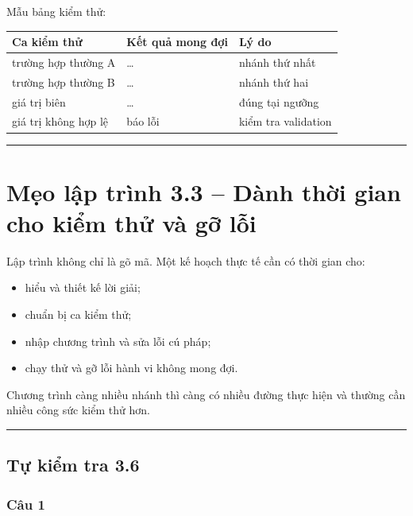 \documentclass[
  11pt,
  a4paper,
]{article}
\providecommand{\tightlist}{%
  \setlength{\itemsep}{0pt}\setlength{\parskip}{0pt}}
\begin{document}
Mẫu bảng kiểm thử:

\begin{longtable}[]{@{}lll@{}}
\toprule\noalign{}
Ca kiểm thử & Kết quả mong đợi & Lý do \\
\midrule\noalign{}
\endhead
\bottomrule\noalign{}
\endlastfoot
trường hợp thường A & \ldots{} & nhánh thứ nhất \\
trường hợp thường B & \ldots{} & nhánh thứ hai \\
giá trị biên & \ldots{} & đúng tại ngưỡng \\
giá trị không hợp lệ & báo lỗi & kiểm tra validation \\
\end{longtable}

\begin{center}\rule{0.5\linewidth}{0.5pt}\end{center}

\section{Mẹo lập trình 3.3 -- Dành thời gian cho kiểm thử và gỡ
lỗi}\label{mux1eb9o-lux1eadp-truxecnh-3.3-duxe0nh-thux1eddi-gian-cho-kiux1ec3m-thux1eed-vuxe0-gux1ee1-lux1ed7i}

Lập trình không chỉ là gõ mã. Một kế hoạch thực tế cần có thời gian cho:

\begin{itemize}
\tightlist
\item
  hiểu và thiết kế lời giải;
\item
  chuẩn bị ca kiểm thử;
\item
  nhập chương trình và sửa lỗi cú pháp;
\item
  chạy thử và gỡ lỗi hành vi không mong đợi.
\end{itemize}

Chương trình càng nhiều nhánh thì càng có nhiều đường thực hiện và
thường cần nhiều công sức kiểm thử hơn.

\begin{center}\rule{0.5\linewidth}{0.5pt}\end{center}

\subsection{Tự kiểm tra 3.6}\label{tux1ef1-kiux1ec3m-tra-3.6}

\subsubsection{Câu 1}\label{cuxe2u-1-5}
\end{document}
